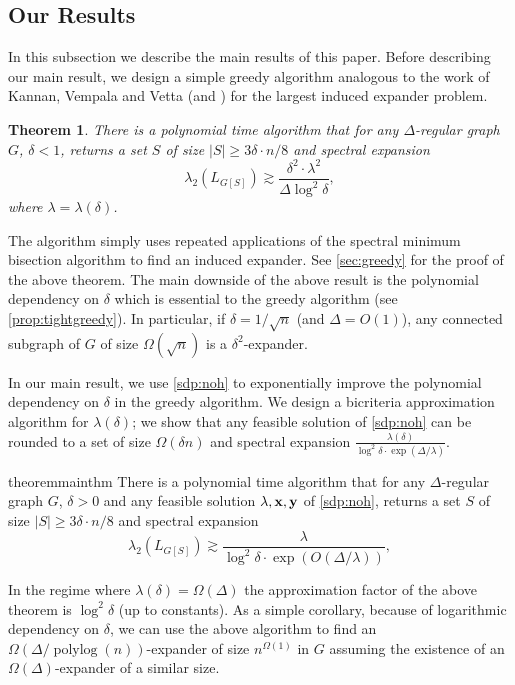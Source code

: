 \documentclass[11pt]{article}
\def\bx{{\bf x}}
\def\by{{\bf y}}
\newtheorem{theorem}{Theorem}[section]
\DeclareMathOperator{\polylog}{polylog}
\begin{document}
\subsection{Our Results}
\label{subsec:ourresults}
In this subsection we describe the main results of this paper. 
Before describing our main result, we design a simple greedy algorithm analogous to the work of Kannan, Vempala and Vetta \cite{KVV04} (and \cite{Tre05,AO14}) for the largest induced expander problem. 
\begin{theorem}
\label{thm:greedy}
There is a polynomial time algorithm that for any $\Delta$-regular graph $G$, $\delta < 1$, returns a set $S$ of size $|S| \geq 3\delta\cdot n/8$ and spectral expansion 
$$\lambda_2(L_{G[S]}) \gtrsim \frac{\delta^2\cdot \lambda^2}{\Delta\log^2 \delta},$$
where $\lambda = \lambda(\delta)$.
\end{theorem}
The algorithm simply uses repeated applications of the spectral minimum bisection algorithm to find an induced expander. See \autoref{sec:greedy} for the proof of the above theorem. The main downside of the above result is the polynomial dependency on $\delta$ which is essential to the greedy algorithm (see \autoref{prop:tightgreedy}). 
In particular, if $\delta=1/\sqrt{n}$ (and $\Delta=O(1)$), any connected subgraph of $G$ of size $\Omega(\sqrt{n})$ is a $\delta^2$-expander.

In our main result, we use \ref{sdp:noh} to exponentially improve the polynomial dependency on $\delta$ in the greedy algorithm. 
We design a bicriteria approximation algorithm for $\lambda(\delta)$; we show that any feasible solution of \ref{sdp:noh} can be rounded to a set of size $\Omega(\delta n)$ and spectral expansion $\frac{\lambda(\delta)}{\log^2\delta \cdot \exp(\Delta/\lambda)}$.

\begin{restatable}{theorem}{mainthm}
\label{thm:maintheoremwithoutoutsideexpansion}
There is a polynomial time algorithm that for any $\Delta$-regular graph $G$, $\delta>0$ and any feasible solution $\lambda,\bx,\by$ of \ref{sdp:noh},
 returns a set $S$ of size $|S|\geq 3\delta\cdot n/8$ and spectral expansion
$$ \lambda_2(L_{G[S]}) \gtrsim \dfrac{{\lambda}}{\log^2 \delta\cdot \exp(O(\Delta/\lambda))},$$ 
\end{restatable}
In the regime where $\lambda(\delta)=\Omega(\Delta)$ the approximation factor of the above theorem is $\log^2\delta$ (up to constants).
As a simple corollary, because of logarithmic dependency on $\delta$, we can use the above algorithm to find an $\Omega(\Delta/\polylog(n))$-expander of size $n^{\Omega(1)}$ in $G$ assuming the existence of an $\Omega(\Delta)$-expander of a similar size.
\end{document}
